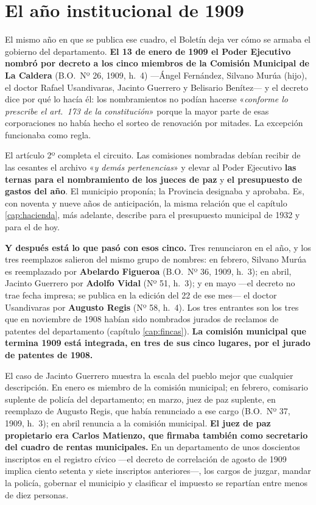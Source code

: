 \section{El año institucional de 1909}

El mismo año en que se publica ese cuadro, el Boletín deja ver cómo se armaba el gobierno del
departamento. \textbf{El 13 de enero de 1909 el Poder Ejecutivo nombró por decreto a los cinco
miembros de la Comisión Municipal de La Caldera} (B.O.\ Nº 26, 1909, h.\ 4) ---Ángel Fernández,
Silvano Murúa (hijo), el doctor Rafael Usandivaras, Jacinto
Guerrero y Belisario Benítez--- y el decreto dice por qué lo hacía él:
los nombramientos no podían hacerse «\textit{conforme lo prescribe el art.\ 173 de la
constitución}» porque la mayor parte de esas corporaciones no había hecho el sorteo de
renovación por mitades. La excepción funcionaba como regla.

El artículo 2º completa el circuito. Las comisiones nombradas debían recibir de las cesantes el
archivo «\textit{y demás pertenencias}» y elevar al Poder Ejecutivo \textbf{las ternas para el
nombramiento de los jueces de paz} y \textbf{el presupuesto de gastos del año}. El municipio
proponía; la Provincia designaba y aprobaba. Es, con noventa y nueve años de anticipación, la
misma relación que el capítulo \ref{cap:hacienda}, más adelante, describe para el presupuesto municipal de
1932 y para el de hoy.

\textbf{Y después está lo que pasó con esos cinco.} Tres renunciaron en el año, y los tres
reemplazos salieron del mismo grupo de nombres: en febrero, Silvano Murúa
es reemplazado por \textbf{Abelardo Figueroa} (B.O.\ Nº 36, 1909, h.\ 3); en abril, Jacinto
Guerrero por \textbf{Adolfo Vidal} (Nº 51, h.\ 3); y en mayo ---el decreto no trae fecha impresa; se publica en la edición del 22 de ese mes--- el doctor Usandivaras por
\textbf{Augusto Regis} (Nº 58, h.\ 4). Los tres entrantes son los tres que en noviembre
de 1908 habían sido nombrados jurados de reclamos de patentes del departamento (capítulo
\ref{cap:fincas}). \textbf{La comisión municipal que termina 1909 está integrada, en tres de sus
cinco lugares, por el jurado de patentes de 1908.}

El caso de Jacinto Guerrero muestra la escala del pueblo mejor que
cualquier descripción. En enero es miembro de la comisión municipal; en febrero, comisario
suplente de policía del departamento; en marzo, juez de paz suplente, en reemplazo de Augusto
Regis, que había renunciado a ese cargo (B.O.\ Nº 37, 1909, h.\ 3); en abril renuncia a la comisión
municipal. \textbf{El juez de paz propietario era Carlos Matienzo, que
firmaba también como secretario del cuadro de rentas municipales.} En un departamento de unos
doscientos inscriptos en el registro cívico ---el decreto de correlación de agosto de 1909
implica ciento setenta y siete inscriptos anteriores---, los cargos de juzgar, mandar la policía,
gobernar el municipio y clasificar el impuesto se repartían entre menos de diez personas.

